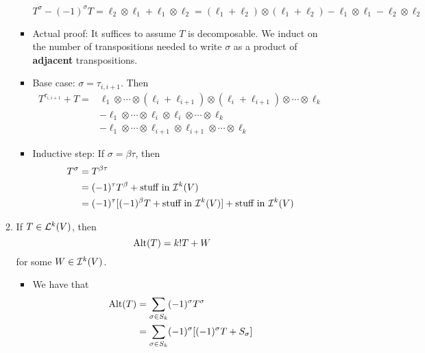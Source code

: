 \documentclass[../notes.tex]{subfiles}
\begin{document}
\begin{itemize}
\begin{enumerate}
\begin{itemize}
            \begin{equation*}
                T^\sigma-(-1)^\sigma T = \ell_2\otimes\ell_1+\ell_1\otimes\ell_2
                = (\ell_1+\ell_2)\otimes(\ell_1+\ell_2)-\ell_1\otimes\ell_1-\ell_2\otimes\ell_2
            \end{equation*}
            \item Actual proof: It suffices to assume $T$ is decomposable. We induct on the number of transpositions needed to write $\sigma$ as a product of \textbf{adjacent} transpositions.
            \item Base case: $\sigma=\tau_{i,i+1}$. Then
            \begin{equation*}
                \begin{split}
                    T^{\tau_{i,i+1}}+T ={}& \ell_1\otimes\cdots\otimes(\ell_i+\ell_{i+1})\otimes(\ell_i+\ell_{i+1})\otimes\cdots\otimes\ell_k\\
                    &-\ell_1\otimes\cdots\otimes\ell_i\otimes\ell_i\otimes\cdots\otimes\ell_k\\
                    &-\ell_1\otimes\cdots\otimes\ell_{i+1}\otimes\ell_{i+1}\otimes\cdots\otimes\ell_k
                \end{split}
            \end{equation*}
            \item Inductive step: If $\sigma=\beta\tau$, then
            \begin{align*}
                T^\sigma &= T^{\beta\tau}\\
                &= (-1)^\tau T^\beta+\text{stuff in }\ide[k]{V}\\
                &= (-1)^\tau[(-1)^\beta T+\text{stuff in }\ide[k]{V}]+\text{stuff in }\ide[k]{V}
            \end{align*}
        \end{itemize}
        \item If $T\in\lin[k]{V}$, then
        \begin{equation*}
            \Alt(T) = k!T+W
        \end{equation*}
        for some $W\in\ide[k]{V}$.
        \begin{itemize}
            \item We have that
            \begin{align*}
                \Alt(T) &= \sum_{\sigma\in S_k}(-1)^\sigma T^\sigma\\
                &= \sum_{\sigma\in S_k}(-1)^\sigma[(-1)^\sigma T+S_\sigma]\\

\end{align*}
\end{itemize}
\end{enumerate}
\end{itemize}
\end{document}
